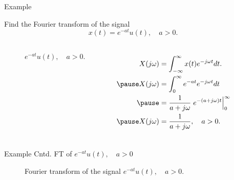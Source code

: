 \begin{frame}{Example}
    \begin{example}
        Find the Fourier transform of the signal
        \begin{equation*}
            x(t) = e^{-at}u(t), \quad a> 0.
        \end{equation*}
    \end{example}
    \pause
    {
        \begin{columns}
                {
                    \begin{figure}
                      \centering
                      
                      \caption{$e^{-at}u(t), \quad a> 0$.}\label{fi:eatut_signal}
                    \end{figure}
                }
                \begin{equation*}
                    \begin{aligned}
                        X(j\omega) &= \int_{-\infty}^{\infty}x(t)e^{-j\omega t} dt.\\ \pause
                        X(j\omega) &= \int_{0}^{\infty} e^{-at}e^{-j\omega t}dt\\ \pause
                        &= \frac{1}{a+j\omega}\left. e^{-(a+j\omega)t}\right|_{0}^{\infty}\\ \pause
                        X(j\omega) &= \frac{1}{a+j\omega}, \quad a>0.
                    \end{aligned}
                \end{equation*}
        \end{columns}
    }
\end{frame}

\begin{frame}[plain]{Example Cntd. FT of $e^{-at}u(t), \quad a> 0$}
    {
        \begin{figure}
          \centering
          
          \caption{Fourier transform of the signal $e^{-at}u(t), \quad a> 0$.}\label{fi:eatut}
        \end{figure}
    }
\end{frame}

